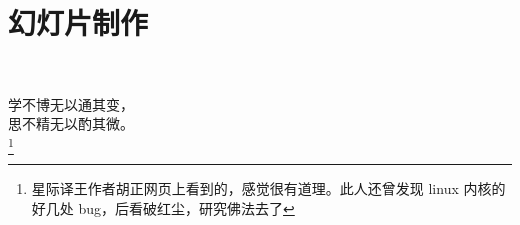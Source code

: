 \chapter{幻灯片制作}
\thispagestyle{fancy}

~\\[9cm]
\begin{flushright}
\kai\xiaosi
\textcolor[rgb]{0.00,0.50,0.00}{
学不博无以通其变，\\
思不精无以酌其微。\\\footnote{\textcolor[rgb]{0.00,0.50,0.00}{星际译王作者胡正网页上看到的，感觉很有道理。此人还曾发现 linux 内核的好几处 bug，后看破红尘，研究佛法去了}}\\
}
\end{flushright}






